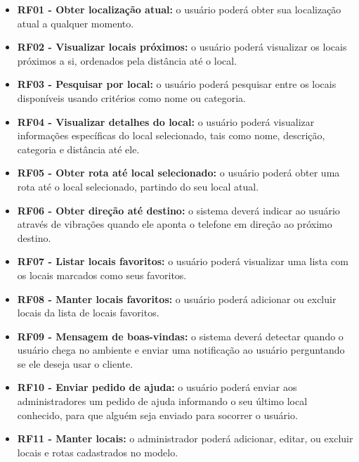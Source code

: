 \documentclass[twoside,english,brazilian]{UNISINOSartigo}
\begin{document}
 \begin{itemize}
 	\item \textbf{RF01 - Obter localização atual:} o usuário poderá obter sua localização atual a qualquer momento.
		
 	\item \textbf{RF02 - Visualizar locais próximos:} o usuário poderá visualizar os locais próximos a si, ordenados pela distância até o local.
		
 	\item \textbf{RF03 - Pesquisar por local:} o usuário poderá pesquisar entre os locais disponíveis usando critérios como nome ou categoria.
		
 	\item \textbf{RF04 - Visualizar detalhes do local:} o usuário poderá visualizar informações específicas do local selecionado, tais como nome, descrição, categoria e distância até ele.

 	\item \textbf{RF05 - Obter rota até local selecionado:} o usuário poderá obter uma rota até o local selecionado, partindo do seu local atual.

	\item \textbf{RF06 - Obter direção até destino:} o sistema deverá indicar ao usuário através de vibrações quando ele aponta o telefone em direção ao próximo destino.

 	\item \textbf{RF07 - Listar locais favoritos:} o usuário poderá visualizar uma lista com os locais marcados como seus favoritos.
		
 	\item \textbf{RF08 - Manter locais favoritos:} o usuário poderá adicionar ou excluir locais da lista de locais favoritos.
		
 	\item \textbf{RF09 - Mensagem de boas-vindas:} o sistema deverá detectar quando o usuário chega no ambiente e enviar uma notificação ao usuário perguntando se ele deseja usar o cliente.

 	\item \textbf{RF10 - Enviar pedido de ajuda:} o usuário poderá enviar aos administradores um pedido de ajuda informando o seu último local conhecido, para que alguém seja enviado para socorrer o usuário.
		
 	\item \textbf{RF11 - Manter locais:} o administrador poderá adicionar, editar, ou excluir locais e rotas cadastrados no modelo.
		

\end{itemize}
\end{document}
